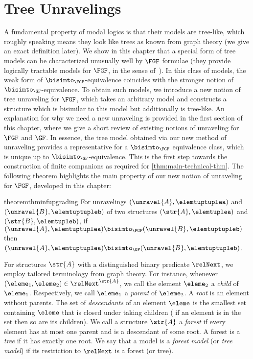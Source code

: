 \chapter{Tree Unravelings}\label{chap:unraveling}
A fundamental property of modal logics is that their models are tree-like, which roughly speaking means they look like trees as known from graph theory (we give an exact definition later).
We show in this chapter that a special form of tree models can be characterized unusually well by $\FGF$ formulae (they provide logically tractable models for $\FGF$, in the sense of~\cite{otto2013}).
In this class of models, the weak form of $\bisimto_{\FGF}$-equivalence coincides with the stronger notion of $\bisimto_{\GF}$-equivalence.
To obtain such models, we introduce a new notion of tree unraveling for $\FGF$, which takes an arbitrary model and constructs a structure which is bisimilar to this model but additionally is tree-like.
An explanation for why we need a new unraveling is provided in the first section of this chapter, where we give a short review of existing notions of unraveling for $\FGF$ and $\GF$.
In essence, the tree model obtained via our new method of unraveling provides a representative for a $\bisimto_{\FGF}$ equivalence class, which is unique up to $\bisimto_{\GF}$-equivalence.
This is the first step towards the construction of finite companions as required for \cref{thm:main-technical-thm}.
The following theorem highlights the main property of our new notion of unraveling for $\FGF$, developed in this chapter:
\begin{restatable*}{theorem}{thminfupgrading}\label{thm:inf-bisim-upgrading}
  For unravelings $(\unravel{A}, \elemtuptuplea)$ and $(\unravel{B}, \elemtuptupleb)$  of two structures $(\str{A}, \elemtuplea)$ and $(\str{B}, \elemtupleb)$, if $(\unravel{A}, \elemtuptuplea) \bisimto_{\FGF} (\unravel{B}, \elemtuptupleb)$ then $(\unravel{A}, \elemtuptuplea) \bisimto_{\GF} (\unravel{B}, \elemtuptupleb)$.
\end{restatable*}%

For structures $\str{A}$ with a distinguished binary predicate $\relNext$, we employ tailored terminology from graph theory.
For instance, whenever $(\eleme_1, \eleme_2) \in \relNext^{\str{A}}$, we call the element $\eleme_2$ a \emph{child} of $\eleme_1$. Respectively, we call $\eleme_1$ a \emph{parent} of $\eleme_2$.
A \emph{root} is an element without parents.
The set of \emph{descendants} of an element $\eleme$ is the smallest set containing $\eleme$ that is closed under taking children (\ie{} if an element is in the set then so are its children).
We call a structure $\str{A}$ a \emph{forest} if every element has at most one parent and is a descendant of some root.
A forest is a \emph{tree} if it has exactly one root.
We say that a model is a \emph{forest model} (or \emph{tree model}) if its restriction to $\relNext$ is a forest (or tree).

